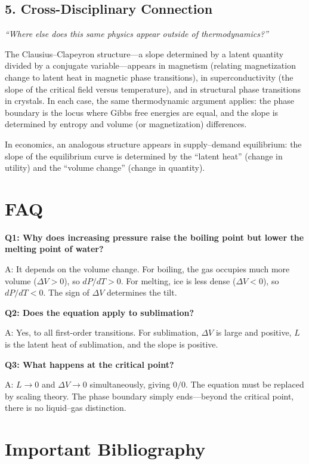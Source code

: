 \documentclass[11pt,openright]{book}
\begin{document}
\subsection*{5. Cross-Disciplinary Connection}
\textit{``Where else does this same physics appear outside of thermodynamics?''}

The Clausius--Clapeyron structure---a slope determined by a latent quantity divided by a conjugate variable---appears in magnetism (relating magnetization change to latent heat in magnetic phase transitions), in superconductivity (the slope of the critical field versus temperature), and in structural phase transitions in crystals. In each case, the same thermodynamic argument applies: the phase boundary is the locus where Gibbs free energies are equal, and the slope is determined by entropy and volume (or magnetization) differences.

In economics, an analogous structure appears in supply--demand equilibrium: the slope of the equilibrium curve is determined by the ``latent heat'' (change in utility) and the ``volume change'' (change in quantity).


\section*{FAQ}

\textbf{Q1: Why does increasing pressure raise the boiling point but lower the melting point of water?}

A: It depends on the volume change. For boiling, the gas occupies much more volume ($\Delta V > 0$), so $dP/dT > 0$. For melting, ice is less dense ($\Delta V < 0$), so $dP/dT < 0$. The sign of $\Delta V$ determines the tilt.

\textbf{Q2: Does the equation apply to sublimation?}

A: Yes, to all first-order transitions. For sublimation, $\Delta V$ is large and positive, $L$ is the latent heat of sublimation, and the slope is positive.

\textbf{Q3: What happens at the critical point?}

A: $L \to 0$ and $\Delta V \to 0$ simultaneously, giving $0/0$. The equation must be replaced by scaling theory. The phase boundary simply ends---beyond the critical point, there is no liquid--gas distinction.
\section*{Important Bibliography}
\end{document}
